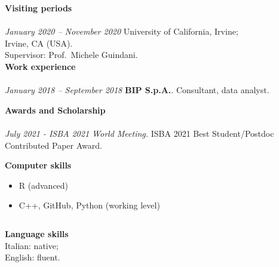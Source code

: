 \documentclass[10pt]{amsart}
\begin{document}
	{\large {\bf Visiting periods}} \\[-.08cm] 
	\underline{\hspace{6in}}\\[.2cm] 
	{\it January 2020 -- November 2020 }\newline
	University of California, Irvine;\\ Irvine, CA (USA).\\
	Supervisor: Prof.\ Michele Guindani. \newline
	\\



	 
	{\large {\bf Work experience}} \\[-.08cm] 
	\underline{\hspace{6in}} \\[.2cm] 
	{\it January 2018 -- September 2018}\newline
	{\bf BIP S.p.A.}. \newline
	Consultant, data analyst.
	\newline\newline
	
	
 	{\large {\bf Awards and Scholarship}} \\[-.08cm] 
	\underline{\hspace{6in}} \\[.2cm]
	{\it July 2021 - ISBA 2021 World Meeting.}\newline
	ISBA 2021 Best Student/Postdoc Contributed Paper Award.  
	\newline\newline
	
	
	 
	{\large {\bf Computer skills}} \\[-.08cm] 
	\underline{\hspace{6in}} 
	\begin{itemize}
	\item  R (advanced)
	\item  C++, GitHub, Python (working level)
	\end{itemize}
	
	$\,$\newline


	{\large {\bf Language skills}} \\[-.08cm] 
	\underline{\hspace{6in}} \newline
	Italian: native;\\
	English: fluent.  
	\newline
\newline
\newline
	 
\end{document}
